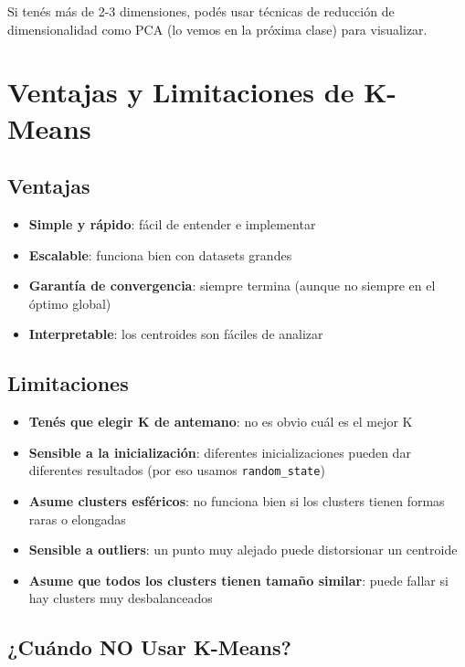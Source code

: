 \documentclass[12pt]{article}
\begin{document}
Si tenés más de 2-3 dimensiones, podés usar técnicas de reducción de dimensionalidad como PCA (lo vemos en la próxima clase) para visualizar.

\section{Ventajas y Limitaciones de K-Means}

\subsection{Ventajas}

\begin{itemize}
    \item \textbf{Simple y rápido}: fácil de entender e implementar
    \item \textbf{Escalable}: funciona bien con datasets grandes
    \item \textbf{Garantía de convergencia}: siempre termina (aunque no siempre en el óptimo global)
    \item \textbf{Interpretable}: los centroides son fáciles de analizar
\end{itemize}

\subsection{Limitaciones}

\begin{itemize}
    \item \textbf{Tenés que elegir K de antemano}: no es obvio cuál es el mejor K
    \item \textbf{Sensible a la inicialización}: diferentes inicializaciones pueden dar diferentes resultados (por eso usamos \texttt{random\_state})
    \item \textbf{Asume clusters esféricos}: no funciona bien si los clusters tienen formas raras o elongadas
    \item \textbf{Sensible a outliers}: un punto muy alejado puede distorsionar un centroide
    \item \textbf{Asume que todos los clusters tienen tamaño similar}: puede fallar si hay clusters muy desbalanceados
\end{itemize}

\subsection{¿Cuándo NO Usar K-Means?}
\end{document}
